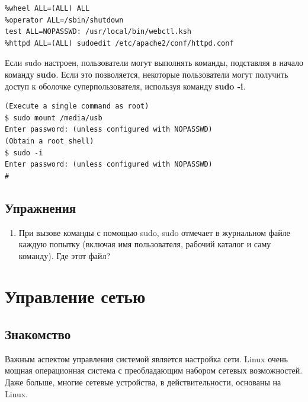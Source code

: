 \documentclass[10pt]{book}
\begin{document}
\begin{tcolorbox}
\begin{lstlisting}
%wheel ALL=(ALL) ALL
%operator ALL=/sbin/shutdown
test ALL=NOPASSWD: /usr/local/bin/webctl.ksh
%httpd ALL=(ALL) sudoedit /etc/apache2/conf/httpd.conf
\end{lstlisting}
\end{tcolorbox}

Если sudo настроен, пользователи могут выполнять команды, подставляя в начало команду \textbf{sudo}. Если это позволяется, некоторые пользователи могут получить доступ к оболочке суперпользователя, используя команду \textbf{sudo -i}.

\begin{tcolorbox}
\begin{lstlisting}
(Execute a single command as root)
$ sudo mount /media/usb
Enter password: (unless configured with NOPASSWD)
(Obtain a root shell)
$ sudo -i
Enter password: (unless configured with NOPASSWD)
#
\end{lstlisting}
\end{tcolorbox}

\newpage
{\color{white}\section{Упражнения}}
\begin{tcolorbox}[title=\textbf{Упражнения}, colback=yellow!14!white, colframe=red!75!white]
\begin{enumerate}
\item При вызове команды с помощью sudo, sudo отмечает в журнальном файле каждую попытку (включая имя пользователя, рабочий каталог и саму команду). Где этот файл?
\end{enumerate}
\end{tcolorbox}

\newpage

\pagestyle{headings}
\chapter{Управление сетью}

\section{Знакомство}
Важным аспектом управления системой является настройка сети. Linux очень мощная операционная система с преобладающим набором сетевых возможностей. Даже больше, многие сетевые устройства, в действительности, основаны на Linux. 
\end{document}
